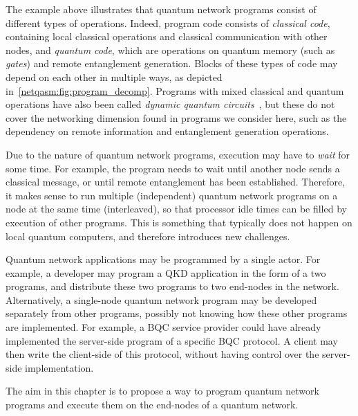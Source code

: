 The example above illustrates that quantum network programs consist of different types of operations.
Indeed, program code consists of \textit{classical code}, containing local classical operations and classical communication with other nodes, and \textit{quantum code}, which are operations on quantum memory (such as \textit{gates}) and remote entanglement generation.
Blocks of these types of code may depend on each other in multiple ways, as depicted in~\cref{netqasm:fig:program_decomp}.
Programs with mixed classical and quantum operations have also been called \textit{dynamic quantum circuits}~\cite{cross2021openqasm, burgholzer2021towards}, but these do not cover the networking dimension found in programs we consider here, such as the dependency on remote information and entanglement generation operations.

Due to the nature of quantum network programs, execution may have to \textit{wait} for some time.
For example, the program needs to wait until another node sends a classical message, or until remote entanglement has been established.
Therefore, it makes sense to run multiple (independent) quantum network programs on a node at the same time (interleaved), so that processor idle times can be filled by execution of other programs.
This is something that typically does not happen on local quantum computers, and therefore introduces new challenges.

Quantum network applications may be programmed by a single actor.
For example, a developer may program a QKD application in the form of a two programs, and distribute these two programs to two end-nodes in the network.
Alternatively, a single-node quantum network program may be developed separately from other programs, possibly not knowing how these other programs are implemented.
For example, a BQC service provider could have already implemented the server-side program of a specific BQC protocol.
A client may then write the client-side of this protocol, without having control over the server-side implementation.

The aim in this chapter is to propose a way to program quantum network programs
and execute them on the end-nodes of a quantum network.


